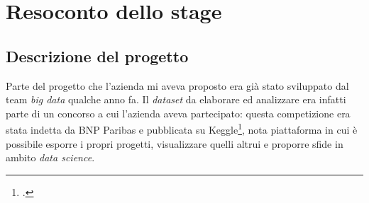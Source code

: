 


\chapter{Resoconto dello stage}
\label{cap:resoconto-stage}

\section{Descrizione del progetto}
Parte del progetto che l'azienda mi aveva proposto era già stato sviluppato dal team \textit{big data} qualche anno fa.
Il \textit{dataset} da elaborare ed analizzare era infatti parte di un concorso a cui l'azienda aveva partecipato: questa competizione era stata indetta da BNP Paribas e pubblicata su Keggle\footcite{https://www.kaggle.com/}, nota piattaforma in cui è possibile esporre i propri progetti, visualizzare quelli altrui e proporre sfide in ambito \textit{data science}.
